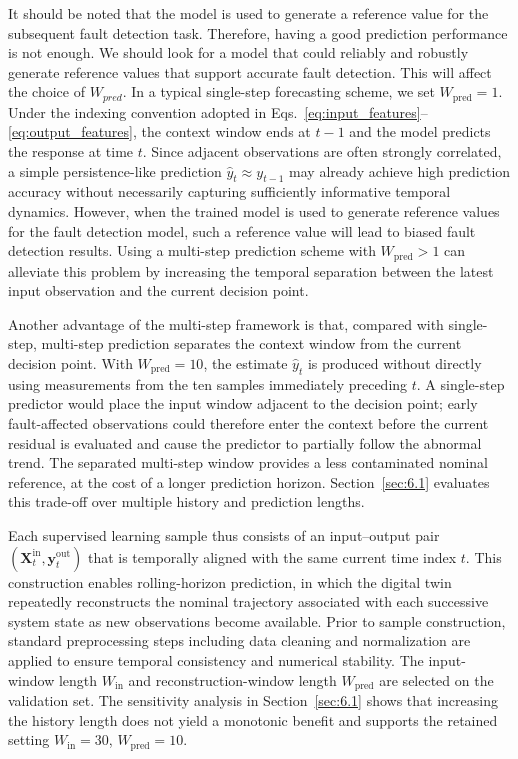 \documentclass[a4paper,10pt]{cas-sc}%
\newcommand{\rev}[1]{\textcolor{revisionred}{#1}}
\newenvironment{revision}{\color{revisionred}}{}
\begin{document}
\begin{revision}
	It should be noted that the model is used to generate a reference value for the subsequent fault detection task. Therefore, having a good prediction performance is not enough. We should look for a model that could reliably and robustly generate reference values that support accurate fault detection. This will affect the choice of $W_{pred}$. In a typical single-step forecasting scheme, we set $W_{\mathrm{pred}}=1$.
	Under the indexing convention adopted in Eqs.~\ref{eq:input_features}--\ref{eq:output_features}, the context window ends at $t-1$ and the model predicts the response at time $t$.
	Since adjacent observations are often strongly correlated, a simple persistence-like prediction
	$\hat{y}_t \approx y_{t-1}$
	may already achieve high prediction accuracy without necessarily capturing sufficiently informative temporal dynamics. However, when the trained model is used to generate reference values for the fault detection model, such a reference value will lead to biased fault detection results. Using a multi-step prediction scheme with $W_{\mathrm{pred}} > 1$ can alleviate this problem by increasing the temporal separation between the latest input observation and the current decision point.

	Another advantage of the multi-step framework is that, compared with single-step, multi-step prediction separates the context window from the current decision point. With $W_{\mathrm{pred}}=10$, the estimate $\hat y_t$ is produced without directly using measurements from the ten samples immediately preceding $t$. A single-step predictor would place the input window adjacent to the decision point; early fault-affected observations could therefore enter the context before the current residual is evaluated and cause the predictor to partially follow the abnormal trend. The separated multi-step window provides a less contaminated nominal reference, at the cost of a longer prediction horizon. Section~\ref{sec:6.1} evaluates this trade-off over multiple history and prediction lengths.
\end{revision}

Each supervised learning sample thus consists of an input--output pair $(\boldsymbol{X}_t^{\mathrm{in}}, \boldsymbol{y}_t^{\mathrm{out}})$ that is temporally aligned with the same current time index $t$. This construction enables rolling-horizon prediction, in which the digital twin repeatedly reconstructs the nominal trajectory associated with each successive system state as new observations become available.
Prior to sample construction, standard preprocessing steps including data cleaning and normalization are applied to ensure temporal consistency and numerical stability. \rev{The input-window length $W_{\mathrm{in}}$ and reconstruction-window length $W_{\mathrm{pred}}$ are selected on the validation set. The sensitivity analysis in Section~\ref{sec:6.1} shows that increasing the history length does not yield a monotonic benefit and supports the retained setting $W_{\mathrm{in}}=30$, $W_{\mathrm{pred}}=10$.}
\end{document}
